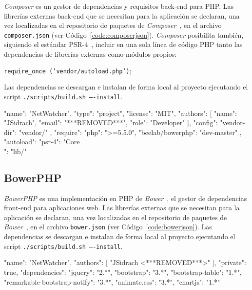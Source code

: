 \textit{Composer} es un gestor de dependencias y requisitos \gls{back-end} para \gls{PHP}.
Las librerías externas \gls{back-end} que se necesitan para la aplicación se declaran, una vez localizadas en el repositorio de paquetes de \textit{Composer}~\cite{composerrepositorio}, en el archivo \texttt{composer.json} (ver Código~\ref{code:composerjson}).
\textit{Composer} posibilita también, siguiendo el estándar PSR-4~\cite{psr4}, incluir en una sola línea de código \gls{PHP} tanto las dependencias de librerías externas como módulos propios:

\texttt{require\_once ('vendor/autoload.php')};

Las dependencias se descargan e instalan de forma local al proyecto ejecutando el \gls{script} \texttt{./scripts/build.sh ----install}.

\begin{code}[label=code:composerjson,language=json,caption=Ejemplo de fichero \textit{composer.json}]
{
  "name": "NetWatcher",
  "type": "project",
  "license": "MIT",
  "authors": [
    {
      "name": "JSidrach",
      "email": "***REMOVED***",
      "role": "Developer"
    }
  ],
  "config": {
    "vendor-dir": "vendor/"
   },
  "require": {
    "php": ">=5.5.0",
    "beelab/bowerphp": "dev-master"
  },
  "autoload": {
    "psr-4": {
      "Core\\": "lib/"
    }
  }
}
\end{code}

\subsection*{BowerPHP\label{extra:mvc:bowerphp}}

\textit{BowerPHP} es una implementación en \gls{PHP} de \textit{Bower}~\cite{bower}, el gestor de dependencias \gls{front-end} para aplicaciones web.
Las librerías externas que se necesitan para la aplicación se declaran, una vez localizadas en el repositorio de paquetes de \textit{Bower}~\cite{bowerrepositorio}, en el archivo \texttt{bower.json} (ver Código~\ref{code:bowerjson}).
Las dependencias se descargan e instalan de forma local al proyecto ejecutando el \gls{script} \texttt{./scripts/build.sh ----install}.

\begin{code}[label=code:bowerjson,language=json,caption=Ejemplo de fichero \textit{bower.json}]
{
  "name": "NetWatcher",
  "authors": [
    "JSidrach <***REMOVED***>"
  ],
  "private": true,
  "dependencies": {
    "jquery": "2.*",
    "bootstrap": "3.*",
    "bootstrap-table": "1.*",
    "remarkable-bootstrap-notify": "3.*",
    "animate.css": "3.*",
    "chartjs": "1.*"
  }
}
\end{code}


